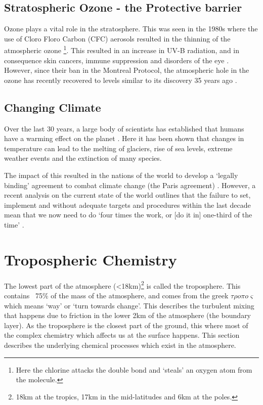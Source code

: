 %
\subsection{Stratospheric Ozone - the Protective barrier}\label{sec:ozonerole}
Ozone plays a vital role in the stratosphere. This was seen in the 1980s where the use of Cloro Floro Carbon (CFC) aerosols resulted in the thinning of the atmospheric ozone \citep{ozonehole}\footnote{Here the chlorine attacks the double bond and `steals' an oxygen atom from the  molecule.}. This resulted in an increase in UV-B radiation, and in consequence skin cancers, immune suppression and disorders of the eye \citep{o3damage}. However, since their ban in the Montreal Protocol, the atmospheric hole in the ozone has recently recovered to levels similar to its discovery 35 years ago \citep{ozonerepair}.


\subsection{Changing Climate} \label{sec:climatechange}
Over the last 30 years, a large body of scientists has established that humans have a warming effect on the planet \citep{IPCC1990Science,IPCC1995Science,IPCC2007Science,IPCC2013Science,ipbes}. Here it has been shown that changes in temperature can lead to the melting of glaciers, rise of sea levels, extreme weather events and the extinction of many species.

The impact of this resulted in the nations of the world to develop a `legally binding' agreement to combat climate change (the Paris agreement) \citep{paris1,paris}. However, a recent analysis on the current state of the world outlines that the failure to set, implement and without adequate targets and procedures within the last decade mean that we now need to do `four times the work, or [do it in] one-third of the time' \citep{failparis}.



\section{Tropospheric Chemistry}

The lowest part of the atmosphere (<18km)\footnote{18km at the tropics, 17km in the mid-latitudes and 6km at the poles. } is called the troposphere. This contains ~75\% of the mass of the atmosphere, and comes from the greek $\tau\rho o \pi o \varsigma$ which means `way' or `turn towards change'. This describes the turbulent mixing that happens due to friction in the lower 2km of the atmosphere (the boundary layer). As the troposphere is the closest part of the ground, this where most of the complex chemistry which affects us at the surface happens. This section describes the underlying chemical processes which exist in the atmosphere.




